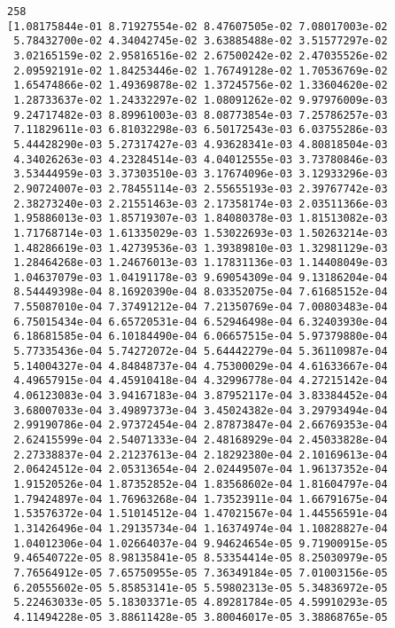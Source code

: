 \documentclass[11pt]{article}
\begin{document}
    \begin{Verbatim}[commandchars=\\\{\}]
258
[1.08175844e-01 8.71927554e-02 8.47607505e-02 7.08017003e-02
 5.78432700e-02 4.34042745e-02 3.63885488e-02 3.51577297e-02
 3.02165159e-02 2.95816516e-02 2.67500242e-02 2.47035526e-02
 2.09592191e-02 1.84253446e-02 1.76749128e-02 1.70536769e-02
 1.65474866e-02 1.49369878e-02 1.37245756e-02 1.33604620e-02
 1.28733637e-02 1.24332297e-02 1.08091262e-02 9.97976009e-03
 9.24717482e-03 8.89961003e-03 8.08773854e-03 7.25786257e-03
 7.11829611e-03 6.81032298e-03 6.50172543e-03 6.03755286e-03
 5.44428290e-03 5.27317427e-03 4.93628341e-03 4.80818504e-03
 4.34026263e-03 4.23284514e-03 4.04012555e-03 3.73780846e-03
 3.53444959e-03 3.37303510e-03 3.17674096e-03 3.12933296e-03
 2.90724007e-03 2.78455114e-03 2.55655193e-03 2.39767742e-03
 2.38273240e-03 2.21551463e-03 2.17358174e-03 2.03511366e-03
 1.95886013e-03 1.85719307e-03 1.84080378e-03 1.81513082e-03
 1.71768714e-03 1.61335029e-03 1.53022693e-03 1.50263214e-03
 1.48286619e-03 1.42739536e-03 1.39389810e-03 1.32981129e-03
 1.28464268e-03 1.24676013e-03 1.17831136e-03 1.14408049e-03
 1.04637079e-03 1.04191178e-03 9.69054309e-04 9.13186204e-04
 8.54449398e-04 8.16920390e-04 8.03352075e-04 7.61685152e-04
 7.55087010e-04 7.37491212e-04 7.21350769e-04 7.00803483e-04
 6.75015434e-04 6.65720531e-04 6.52946498e-04 6.32403930e-04
 6.18681585e-04 6.10184490e-04 6.06657515e-04 5.97379880e-04
 5.77335436e-04 5.74272072e-04 5.64442279e-04 5.36110987e-04
 5.14004327e-04 4.84848737e-04 4.75300029e-04 4.61633667e-04
 4.49657915e-04 4.45910418e-04 4.32996778e-04 4.27215142e-04
 4.06123083e-04 3.94167183e-04 3.87952117e-04 3.83384452e-04
 3.68007033e-04 3.49897373e-04 3.45024382e-04 3.29793494e-04
 2.99190786e-04 2.97372454e-04 2.87873847e-04 2.66769353e-04
 2.62415599e-04 2.54071333e-04 2.48168929e-04 2.45033828e-04
 2.27338837e-04 2.21237613e-04 2.18292380e-04 2.10169613e-04
 2.06424512e-04 2.05313654e-04 2.02449507e-04 1.96137352e-04
 1.91520526e-04 1.87352852e-04 1.83568602e-04 1.81604797e-04
 1.79424897e-04 1.76963268e-04 1.73523911e-04 1.66791675e-04
 1.53576372e-04 1.51014512e-04 1.47021567e-04 1.44556591e-04
 1.31426496e-04 1.29135734e-04 1.16374974e-04 1.10828827e-04
 1.04012306e-04 1.02664037e-04 9.94624654e-05 9.71900915e-05
 9.46540722e-05 8.98135841e-05 8.53354414e-05 8.25030979e-05
 7.76564912e-05 7.65750955e-05 7.36349184e-05 7.01003156e-05
 6.20555602e-05 5.85853141e-05 5.59802313e-05 5.34836972e-05
 5.22463033e-05 5.18303371e-05 4.89281784e-05 4.59910293e-05
 4.11494228e-05 3.88611428e-05 3.80046017e-05 3.38868765e-05

\end{Verbatim}
\end{document}
